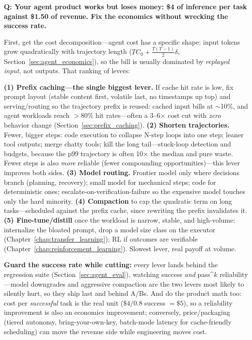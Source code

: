 \begin{interviewq}
\textbf{Q: Your agent product works but loses money: \$4 of inference per task against \$1.50 of revenue. Fix the economics without wrecking the success rate.}

 \quad {} \quad \badgefreq{\freqmed}

\stronganswer

First, get the cost decomposition---agent cost has a specific shape: input tokens grow quadratically with trajectory length ($T C_0 + \frac{T(T-1)}{2}\delta$, Section~\ref{sec:agent_economics}), so the bill is usually dominated by \textit{replayed input}, not outputs. That ranking of levers:

\textbf{(1) Prefix caching---the single biggest lever.} If cache hit rate is low, fix prompt layout (stable content first, volatile last, no timestamps up top) and serving/routing so the trajectory prefix is reused: cached input bills at $\sim$10\%, and agent workloads reach $>$80\% hit rates---often a 3--6$\times$ cost cut with \textit{zero} behavior change (Section~\ref{sec:prefix_caching}). \textbf{(2) Shorten trajectories.} Fewer, bigger steps: code execution to collapse N-step loops into one step; leaner tool outputs; merge chatty tools; kill the long tail---stuck-loop detection and budgets, because the p99 trajectory is often 10$\times$ the median and pure waste. Fewer steps is also \textit{more} reliable (fewer compounding opportunities)---this lever improves both sides. \textbf{(3) Model routing.} Frontier model only where decisions branch (planning, recovery); small model for mechanical steps; code for deterministic ones; escalate-on-verification-failure so the expensive model touches only the hard minority. \textbf{(4) Compaction} to cap the quadratic term on long tasks---scheduled against the prefix cache, since rewriting the prefix invalidates it. \textbf{(5) Fine-tune/distill} once the workload is narrow, stable, and high-volume: internalize the bloated prompt, drop a model size class on the executor (Chapter~\ref{chap:transfer_learning}); RL if outcomes are verifiable (Chapter~\ref{chap:reinforcement_learning}). Slowest lever, real payoff at volume.

\textbf{Guard the success rate while cutting:} every lever lands behind the regression suite (Section~\ref{sec:agent_eval}), watching success \textit{and} pass\textasciicircum{}$k$ reliability---model downgrades and aggressive compaction are the two levers most likely to silently hurt, so they ship last and behind A/Bs. And do the product math too: cost per \textit{successful} task is the real unit ($\$4/0.8$ success $= \$5$), so a reliability improvement is also an economics improvement; conversely, price/packaging (tiered autonomy, bring-your-own-key, batch-mode latency for cache-friendly scheduling) can move the revenue side while engineering moves cost.


\end{interviewq}
